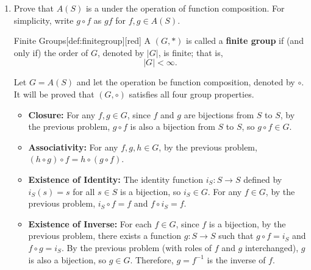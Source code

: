 \begin{enumerate}
\begin{subprove}
    \textbf{($\leftarrow$) Assume that there exists a function \(g: T \to S\) with \(g \circ f = i_{S}\) and \(f \circ g = i_{T}\).}
    It will be proved that \(f\) is a bijection.
    It will be proved that \(f\) is both injective and surjective.\proofstep
    Let \(s_{1}, s_{2} \in S\) be such that \(f(s_{1}) = f(s_{2})\).
    Then,
    \[
    g(f(s_{1})) = g(f(s_{2})).
    \]
    Since \(g \circ f = i_{S}\), it follows that \(s_{1} = s_{2}\).
    Therefore, \(f\) is injective.\proofstep
    Let \(t \in T\) be arbitrary.
    Since \(f \circ g = i_{T}\), it follows that
    \[
    f(g(t)) = t.
    \]
    Therefore, there exists \(s = g(t) \in S\) such that \(f(s) = t\).
    Since \(t\) was arbitrary, it follows that \(f\) is surjective.\proofstep
    Since \(f\) is both injective and surjective, it follows that \(f\) is a bijection.
  \end{subprove}
  \newpage
  \item Prove that \(A(S)\) is a  under the operation of function composition. 
  For simplicity, write \(g \circ f\) as \(g f\) for \(f, g \in A(S)\).
  \begin{define}{Finite Groups}[def:finitegroup][red]
    A  \((G, *)\) is called a \textbf{finite group} if (and only if) 
    the order of \(G\), denoted by \(|G|\), is finite; that is,
    \[
    |G| < \infty.
    \]
  \end{define}
  \begin{subprove}
    Let \(G = A(S)\) and let the operation be function composition, denoted by \(\circ\).
    It will be proved that \((G, \circ)\) satisfies all four group properties.
    \begin{itemize}
      \item \textbf{Closure:} For any \(f, g \in G\), since \(f\) and \(g\) are bijections from \(S\) to \(S\), by the previous problem, \(g \circ f\) is also a bijection from \(S\) to \(S\), so \(g \circ f \in G\).
      \item \textbf{Associativity:} For any \(f, g, h \in G\), by the previous problem, \((h \circ g) \circ f = h \circ (g \circ f)\).
      \item \textbf{Existence of Identity:} The identity function \(i_{S}: S \to S\) defined by \(i_{S}(s) = s\) for all \(s \in S\) is a bijection, so \(i_{S} \in G\). For any \(f \in G\), by the previous problem, \(i_{S} \circ f = f\) and \(f \circ i_{S} = f\).
      \item \textbf{Existence of Inverse:} For each \(f \in G\), since \(f\) is a bijection, by the previous problem, there exists a function \(g: S \to S\) such that \(g \circ f = i_{S}\) and \(f \circ g = i_{S}\). By the previous problem (with roles of \(f\) and \(g\) interchanged), \(g\) is also a bijection, so \(g \in G\). Therefore, \(g = f^{-1}\) is the inverse of \(f\).

\end{itemize}
\end{subprove}
\end{enumerate}
